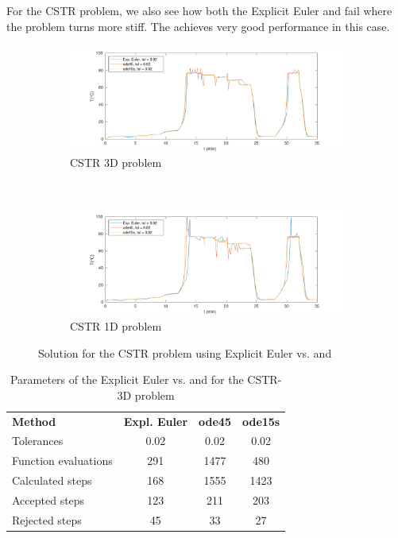 For the CSTR problem, we also see how both the Explicit Euler and  fail where the problem turns more stiff. The  achieves very good performance in this case.
\begin{figure}[H]
    \centering
    \begin{subfigure}{0.8\linewidth}
        \centering
        \includegraphics[width=1\linewidth]{images/2/2_6_3D.pdf} 
        \caption{CSTR 3D problem}
    \end{subfigure} \\
    \begin{subfigure}{0.8\linewidth}
        \centering
        \includegraphics[width=1\linewidth]{images/2/2_6_1D.pdf}
        \caption{CSTR 1D problem}
    \end{subfigure}
    \caption{Solution for the CSTR problem using Explicit Euler vs.  and }
    \label{2_6_3D_1D}
\end{figure}

\begin{table}[H]
    \centering
    \begin{tabular}{@{}l|c|c|c@{}}
    \toprule
    \textbf{Method}      & \textbf{Expl. Euler} & \textbf{ode45} & \textbf{ode15s} \\
    Tolerances           & 0.02                 & 0.02           & 0.02            \\ \midrule
    Function evaluations & 291                  & 1477           & 480             \\
    Calculated steps     & 168                  & 1555           & 1423            \\
    Accepted steps       & 123                  & 211            & 203             \\
    Rejected steps       & 45                   & 33             & 27              \\ \bottomrule
    \end{tabular}
    \caption{Parameters of the Explicit Euler vs.  and  for the CSTR-3D problem}
    \label{2_6_3D_table}
\end{table}

